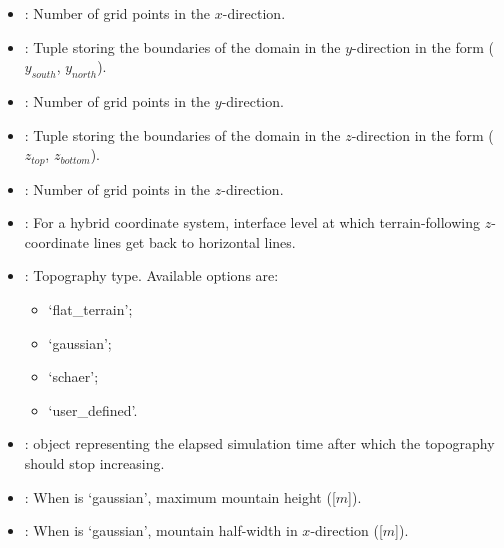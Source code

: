 \documentclass[letterpaper,10pt,english]{sphinxmanual}
\begin{document}
\begin{description}
\begin{itemize}
\item {} 
: Number of grid points in the \(x\)-direction.

\item {} 
: Tuple storing the boundaries of the domain in the          \(y\)-direction in the form (\(y_{south}\), \(y_{north}\)).

\item {} 
: Number of grid points in the \(y\)-direction.

\item {} 
: Tuple storing the boundaries of the domain in the          \(z\)-direction in the form (\(z_{top}\), \(z_{bottom}\)).

\item {} 
: Number of grid points in the \(z\)-direction.

\item {} 
: For a hybrid coordinate system, interface level                 at which terrain-following \(z\)-coordinate lines get back to horizontal lines.

\item {} 
: Topography type. Available options are:
\begin{itemize}
\item {} 
‘flat\_terrain’;

\item {} 
‘gaussian’;

\item {} 
‘schaer’;

\item {} 
‘user\_defined’.

\end{itemize}

\item {} 
:  object representing the elapsed               simulation time after which the topography should stop increasing.

\item {} 
: When  is ‘gaussian’,             maximum mountain height ({[}\(m\){]}).

\item {} 
: When  is ‘gaussian’, mountain               half-width in \(x\)-direction ({[}\(m\){]}).


\end{itemize}
\end{description}
\end{document}
